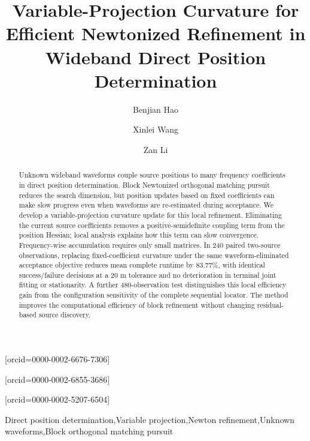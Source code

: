 \documentclass[a4paper,12pt,review]{cas-sc}
\begin{document}
\let\WriteBookmarks\relax
{}
\title[mode=title]{Variable-Projection Curvature for Efficient Newtonized Refinement in Wideband Direct Position Determination}
\author[inst1]{Benjian Hao}[orcid=0000-0002-6676-7306]
\author[inst1]{Xinlei Wang}[orcid=0000-0002-6855-3686]
\author[inst1]{Zan Li}[orcid=0000-0002-5207-6504]
\cormark[1]
\begin{abstract}
Unknown wideband waveforms couple source positions to many frequency coefficients in direct position determination. Block Newtonized orthogonal matching pursuit reduces the search dimension, but position updates based on fixed coefficients can make slow progress even when waveforms are re-estimated during acceptance. We develop a variable-projection curvature update for this local refinement. Eliminating the current source coefficients removes a positive-semidefinite coupling term from the position Hessian; local analysis explains how this term can slow convergence. Frequency-wise accumulation requires only small matrices. In 240 paired two-source observations, replacing fixed-coefficient curvature under the same waveform-eliminated acceptance objective reduces mean complete runtime by 83.77\%, with identical success/failure decisions at a 20 m tolerance and no deterioration in terminal joint fitting or stationarity. A further 480-observation test distinguishes this local efficiency gain from the configuration sensitivity of the complete sequential locator. The method improves the computational efficiency of block refinement without changing residual-based source discovery.
\end{abstract}
\begin{keywords}
Direct position determination\sep Variable projection\sep Newton refinement\sep Unknown waveforms\sep Block orthogonal matching pursuit
\end{keywords}
\maketitle
\end{document}
